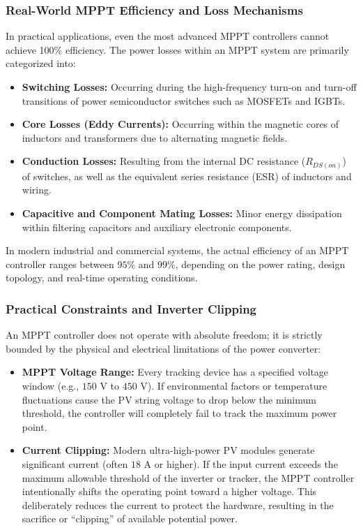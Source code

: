 \subsubsection{Real-World MPPT Efficiency and Loss Mechanisms}
In practical applications, even the most advanced MPPT controllers cannot achieve 100\% efficiency. The power losses within an MPPT system are primarily categorized into:
\begin{itemize}
    \item \textbf{Switching Losses:} Occurring during the high-frequency turn-on and turn-off transitions of power semiconductor switches such as MOSFETs and IGBTs.
    \item \textbf{Core Losses (Eddy Currents):} Occurring within the magnetic cores of inductors and transformers due to alternating magnetic fields.
    \item \textbf{Conduction Losses:} Resulting from the internal DC resistance ($R_{DS(on)}$) of switches, as well as the equivalent series resistance (ESR) of inductors and wiring.
    \item \textbf{Capacitive and Component Mating Losses:} Minor energy dissipation within filtering capacitors and auxiliary electronic components.
\end{itemize}
In modern industrial and commercial systems, the actual efficiency of an MPPT controller ranges between $95\%$ and $99\%$, depending on the power rating, design topology, and real-time operating conditions.

\subsubsection{Practical Constraints and Inverter Clipping}
An MPPT controller does not operate with absolute freedom; it is strictly bounded by the physical and electrical limitations of the power converter:
\begin{itemize}
    \item \textbf{MPPT Voltage Range:} Every tracking device has a specified voltage window (e.g., $150\text{ V}$ to $450\text{ V}$). If environmental factors or temperature fluctuations cause the PV string voltage to drop below the minimum threshold, the controller will completely fail to track the maximum power point.
    \item \textbf{Current Clipping:} Modern ultra-high-power PV modules generate significant current (often $18\text{ A}$ or higher). If the input current exceeds the maximum allowable threshold of the inverter or tracker, the MPPT controller intentionally shifts the operating point toward a higher voltage. This deliberately reduces the current to protect the hardware, resulting in the sacrifice or ``clipping'' of available potential power.
\end{itemize}

